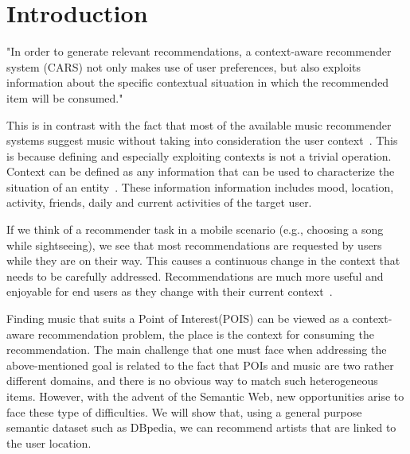 \documentclass[paper=a4, fontsize=11pt]{scrartcl}
\begin{document}
\tableofcontents
\newpage

\section{Introduction}
"In order to generate relevant recommendations, a context-aware recommender system (CARS) not only makes use of user preferences, but also exploits information about the specific contextual situation in which the recommended item will be consumed."~\cite{Baltrunas:2012:CRA:2339097.2339111}

This is in contrast with the fact that most of the available music recommender systems suggest music without taking into consideration the user context~\cite{Knees:2013:SMS:2559928.2542206}. This is because defining and especially exploiting contexts is not a trivial operation. Context can be defined as any information that can be used to characterize the situation of an entity~\cite{Dey:2001:UUC:593570.593572}. These information information includes mood, location, activity, friends, daily and current activities of the target user.

If we think of a recommender task in a mobile scenario (e.g., choosing a song while sightseeing), we see that most recommendations are requested by users while they are on their way. This causes a continuous change in the context that needs to be carefully addressed. Recommendations are much more useful and enjoyable for end users as they change with their current context~\cite{Ostuni:2012:CCM:2887638.2887642}.

Finding music that suits a Point of Interest(POIS) can be viewed as a context-aware recommendation problem, the place is the context for consuming the recommendation. The main challenge that one must face when addressing the above-mentioned goal is related to the fact that POIs and music are two rather different domains, and there is no obvious way to match such heterogeneous items. However, with the advent of the Semantic Web, new opportunities arise to face these type of difficulties. We will show that, using a general purpose semantic dataset such as DBpedia, we can recommend artists that are linked to the user location.
\end{document}
